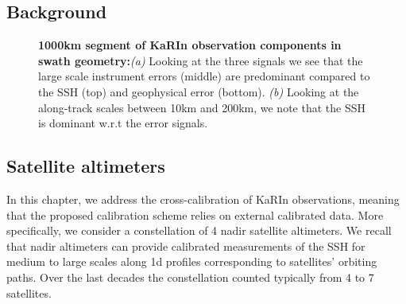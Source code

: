 \begin{bibunit}
\section{Background}
\label{c3sec:background}
\noindent
\begin{figure}[!t]%
   \centering
    \caption{\textbf{1000km segment of KaRIn observation components in swath geometry:}\textit{(a)} Looking at the three signals we see that the large scale instrument errors (middle) are predominant compared to the SSH (top) and geophysical error (bottom). \textit{(b)} Looking at the along-track scales between 10km and 200km, we note that the SSH is dominant w.r.t the error signals.}%
    \label{c3fig:filtered_swath_uncal_comp}%
\end{figure}
\subsection*{Satellite altimeters}
In this chapter, we address the cross-calibration of KaRIn observations, meaning that the proposed calibration scheme relies on external calibrated data. More specifically, we consider a constellation of  4 nadir satellite altimeters. We recall that nadir altimeters can provide calibrated measurements of the SSH for medium to large scales along 1{\sc d} profiles corresponding to satellites' orbiting paths. Over the last decades the constellation counted typically from 4 to 7 satellites.


\end{bibunit}

